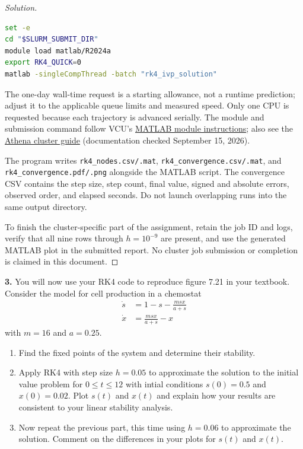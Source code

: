 \documentclass[12pt]{amsart}
\newenvironment{solution}
{\begin{proof}[Solution]}
{\end{proof}}
\begin{document}
\begin{onehalfspace}
\begin{solution}
\begin{lstlisting}[language=bash]
set -e
cd "$SLURM_SUBMIT_DIR"
module load matlab/R2024a
export RK4_QUICK=0
matlab -singleCompThread -batch "rk4_ivp_solution"
            \end{lstlisting}
            The one-day wall-time request is a starting allowance, not a runtime
            prediction; adjust it to the applicable queue limits and measured speed.
            Only one CPU is requested because each trajectory is advanced serially.
            The module and submission command follow VCU's
            \href{https://wiki-vcu.atlassian.net/wiki/spaces/unix/pages/45975823}{MATLAB module instructions};
            also see the
            \href{https://wiki-vcu.atlassian.net/wiki/spaces/unix/pages/45973545}{Athena cluster guide}
            (documentation checked September 15, 2026).

            The program writes \texttt{rk4\_nodes.csv/.mat},
            \texttt{rk4\_convergence.csv/.mat}, and
            \texttt{rk4\_convergence.pdf/.png} alongside the MATLAB script.
            The convergence CSV contains the step size, step count, final value,
            signed and absolute errors, observed order, and elapsed seconds.
            Do not launch overlapping runs into the same output directory.

            To finish the cluster-specific part of the assignment, retain the job ID
            and logs, verify that all nine rows through $h=10^{-9}$ are present, and
            use the generated MATLAB plot in the submitted report. No cluster job
            submission or completion is claimed in this document.
        \end{solution}

        \noindent\textbf{3.} You will now use your RK4 code to reproduce figure 7.21 in your textbook. Consider
        the model for cell production in a chemostat
        \begin{align*}
            \dot{s}&=1-s-\frac{msx}{a+s}\\
            \dot{x}&=\frac{msx}{a+s}-x
        \end{align*}
        with $m=16$ and $a=0.25$.
        \begin{enumerate}
            \item Find the fixed points of the system and determine their stability.
            \item Apply RK4 with step size $h=0.05$ to approximate the solution to the initial value
            problem for $0\le t\le12$ with intial conditions $s(0)=0.5$ and $x(0)=0.02$. Plot
            $s(t)$ and $x(t)$ and explain how your results are consistent to your linear stability
            analysis.
            \item Now repeat the previous part, this time using $h=0.06$ to approximate the
            solution. Comment on the differences in your plots for $s(t)$ and $x(t)$.
        \end{enumerate}


\end{onehalfspace}
\end{document}
